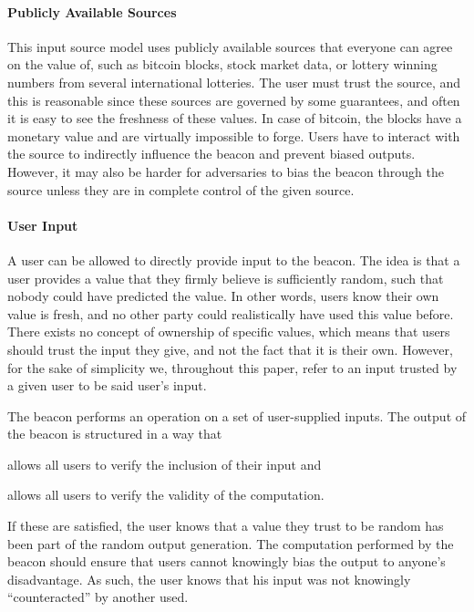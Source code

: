\paragraph{Publicly Available Sources}
This input source model uses publicly available sources that everyone can agree on the value of, such as bitcoin blocks, stock market data, or lottery winning numbers from several international lotteries.
The user must trust the source, and this is reasonable since these sources are governed by some guarantees, and often it is easy to see the freshness of these values.
In case of bitcoin, the blocks have a monetary value and are virtually impossible to forge.
Users have to interact with the source to indirectly influence the beacon and prevent biased outputs.
However, it may also be harder for adversaries to bias the beacon through the source unless they are in complete control of the given source.

\paragraph{User Input}
A user can be allowed to directly provide input to the beacon.
The idea is that a user provides a value that they firmly believe is sufficiently random, such that nobody could have predicted the value.
In other words, users know their own value is fresh, and no other party could realistically have used this value before.
There exists no concept of ownership of specific values, which means that users should trust the input they give, and not the fact that it is their own.
However, for the sake of simplicity we, throughout this paper, refer to an input trusted by a given user to be said user's input.

The beacon performs an operation on a set of user-supplied inputs.
The output of the beacon is structured in a way that
\begin{eletterate*}
    \item allows all users to verify the inclusion of their input and
    \item allows all users to verify the validity of the computation.
\end{eletterate*}

If these are satisfied, the user knows that a value they trust to be random has been part of the random output generation.
The computation performed by the beacon should ensure that users cannot knowingly bias the output to anyone's disadvantage.
As such, the user knows that his input was not knowingly \enquote{counteracted} by another used.

